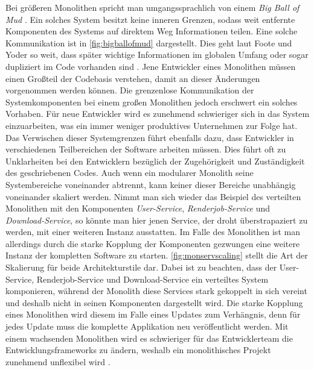     Bei größeren Monolithen spricht man umgangssprachlich von einem \emph{Big Ball of Mud} \parencite[S. 17]{takai2017architektur}. Ein solches System besitzt keine inneren Grenzen, sodass weit entfernte Komponenten des Systems auf direktem Weg Informationen teilen. Eine solche Kommunikation ist in \autoref{fig:bigballofmud} dargestellt. Dies geht laut Foote und Yoder so weit, dass später wichtige Informationen im globalen Umfang oder sogar dupliziert im Code vorhanden sind \parencite{footeyoder1997bigballofmud}. Jene Entwickler eines Monolithen müssen einen Großteil der Codebasis verstehen, damit an dieser Änderungen vorgenommen werden können. Die grenzenlose Kommunikation der Systemkomponenten bei einem großen Monolithen jedoch erschwert ein solches Vorhaben. Für neue Entwickler wird es zunehmend schwieriger sich in das System einzuarbeiten, was ein immer weniger produktives Unternehmen zur Folge hat. Das Verwischen dieser Systemgrenzen führt ebenfalls dazu, dass Entwickler in verschiedenen Teilbereichen der Software arbeiten müssen. Dies führt oft zu Unklarheiten bei den Entwicklern bezüglich der Zugehörigkeit und Zuständigkeit des geschriebenen Codes. Auch wenn ein modularer Monolith seine Systembereiche voneinander abtrennt, kann keiner dieser Bereiche unabhängig voneinander skaliert werden. Nimmt man sich wieder das Beispiel des verteilten Monolithen mit den Komponenten \emph{User-Service}, \emph{Renderjob-Service} und \emph{Download-Service}, so könnte man hier jenen Service, der droht überstrapaziert zu werden, mit einer weiteren Instanz ausstatten. Im Falle des Monolithen ist man allerdings durch die starke Kopplung der Komponenten gezwungen eine weitere Instanz der kompletten Software zu starten. \autoref{fig:monservscaling} stellt die Art der Skalierung für beide Architekturstile dar. Dabei ist zu beachten, dass der User-Service, Renderjob-Service und Download-Service ein verteiltes System komponieren, während der Monolith diese Services stark gekoppelt in sich vereint und deshalb nicht in seinen Komponenten dargestellt wird. Die starke Kopplung eines Monolithen wird diesem im Falle eines Updates zum Verhängnis, denn für jedes Update muss die komplette Applikation neu veröffentlicht werden. Mit einem wachsenden Monolithen wird es schwieriger für das Entwicklerteam die Entwicklungsframeworks zu ändern, weshalb ein monolithisches Projekt zunehmend unflexibel wird \parencites{richardson2018mspatterns}[S. 24]{namiot2014micro}[S. 21--22]{gallipeau2018microservices}.

